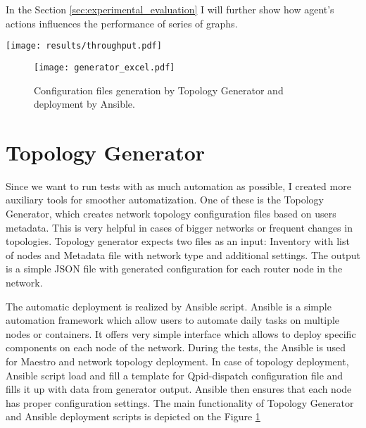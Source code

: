 \documentclass{ExcelAtFIT}
\begin{document}
In the Section \ref{sec:experimental_evaluation} I will further show how agent's actions influences the performance of series of graphs.

\begin{figure*}[h!t]
	\centering
	\texttt{[image: results/throughput.pdf]}
	\caption{Chart of maximum throughput of router and broker during specific test cases.}
	\label{fig:max_rate}
\end{figure*}

\begin{figure}[h!t]
	\centering
	\texttt{[image: generator\_excel.pdf]}
	\caption{Configuration files generation by Topology Generator and deployment by Ansible.}
	\label{fig:generator}
\end{figure}


\section{Topology Generator}
Since we want to run tests with as much automation as possible, I created more auxiliary tools for smoother automatization. One of these is the Topology Generator, which creates network topology configuration files based on users metadata. This is very helpful in cases of bigger networks or frequent changes in topologies. Topology generator expects two files as an input: Inventory with list of nodes and Metadata file with network type and additional settings. The output is a simple JSON file with generated configuration for each router node in the network.

The automatic deployment is realized by Ansible \cite{Ansible} script. Ansible is a simple automation framework which allow users to automate daily tasks on multiple nodes or containers. It offers very simple interface which allows to deploy specific components on each node of the network. During the tests, the Ansible is used for Maestro and network topology deployment. In case of topology deployment, Ansible script load and fill a template for Qpid-dispatch configuration file and fills it up with data from generator output. Ansible then ensures that each node has proper configuration settings. The main functionality of Topology Generator and Ansible deployment scripts is depicted on the Figure \ref{fig:generator}



\end{document}
